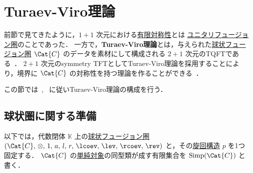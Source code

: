 \documentclass[TQFT_main]{subfiles}
\begin{document}
\section{Turaev-Viro理論}

前節で見てきたように，$1+1$ 次元における\hyperref[ax:symcat-2d-0form]{有限対称性}とは \hyperref[def:tensorfusion-cat]{ユニタリフュージョン圏}のことであった．
一方で，\textbf{Turaev-Viro理論}とは，与えられた\hyperref[def:spherical]{球状フュージョン圏} $\Cat{C}$ のデータを素材にして構成される $2+1$ 次元のTQFTである~\cite{TuraevViro1992TQFT}．
$2+1$ 次元のsymmetry TFTとしてTuraev-Viro理論を採用することにより，境界に $\Cat{C}$ の対称性を持つ理論を作ることができる~\cite{AFM2020}．

この節では~\cite{Bakalov2001lectures}, ~\cite{KirillovBalsam2010TVBW}に従いTuraev-Viro理論の構成を行う．

\subsection{球状圏に関する準備}

以下では，代数閉体 $\mathbb{K}$ 上の\hyperref[def:spherical]{球状フュージョン圏} $(\Cat{C},\, \otimes,\, 1,\, a,\, l,\, r,\, \lcoev,\, \lev,\, \rcoev,\, \rev)$ と，その\hyperref[def:pivotal]{旋回構造} $p$ を1つ固定する．
$\Cat{C}$ の\hyperref[def:semisimple-cat]{単純対象}の同型類が成す有限集合を $\mathrm{Simp}(\Cat{C})$ と書く．
\end{document}
